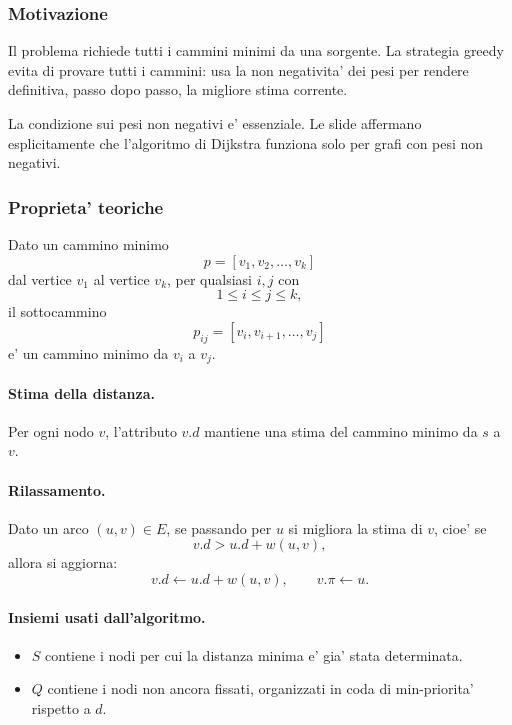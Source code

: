 \subsubsection{Motivazione}
Il problema richiede tutti i cammini minimi da una sorgente. La strategia greedy evita di provare tutti i cammini: usa la non negativita' dei pesi per rendere definitiva, passo dopo passo, la migliore stima corrente.

La condizione sui pesi non negativi e' essenziale. Le slide affermano esplicitamente che l'algoritmo di Dijkstra funziona solo per grafi con pesi non negativi.

\subsubsection{Proprieta' teoriche}
\begin{teorema}
Dato un cammino minimo
\[
p=[v_1,v_2,\ldots,v_k]
\]
dal vertice $v_1$ al vertice $v_k$, per qualsiasi $i,j$ con
\[
1\le i\le j\le k,
\]
il sottocammino
\[
p_{ij}=[v_i,v_{i+1},\ldots,v_j]
\]
e' un cammino minimo da $v_i$ a $v_j$.
\end{teorema}

\paragraph{Stima della distanza.}
Per ogni nodo $v$, l'attributo $v.d$ mantiene una stima del cammino minimo da $s$ a $v$.

\paragraph{Rilassamento.}
Dato un arco $(u,v)\in E$, se passando per $u$ si migliora la stima di $v$, cioe' se
\[
v.d>u.d+w(u,v),
\]
allora si aggiorna:
\[
v.d\gets u.d+w(u,v),
\qquad
v.\pi\gets u.
\]

\paragraph{Insiemi usati dall'algoritmo.}
\begin{itemize}
	\item $S$ contiene i nodi per cui la distanza minima e' gia' stata determinata.
	\item $Q$ contiene i nodi non ancora fissati, organizzati in coda di min-priorita' rispetto a $d$.
\end{itemize}

